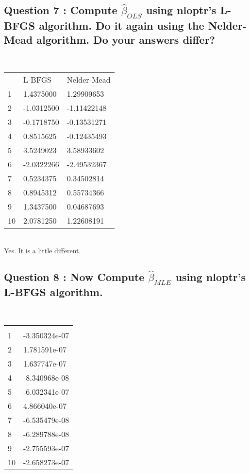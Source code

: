 \documentclass[12pt, letterpaper]{article}
\begin{document}
\subsection*{Question 7 : Compute $\hat{\beta}_{OLS}$ using nloptr's L-BFGS algorithm. Do it again using the Nelder-Mead algorithm. Do your answers differ?}
\\
\begin{table}[h]
\begin{tabular}{lll}
   & L-BFGS & Nelder-Mead    \\
1  & 1.4375000 & 1.29909653 \\
2  & -1.0312500 & -1.11422148 \\
3  & -0.1718750 & -0.13531271 \\
4  & 0.8515625 & -0.12435493 \\
5  & 3.5249023 & 3.58933602 \\
6  & -2.0322266 & -2.49532367 \\
7  & 0.5234375 & 0.34502814 \\
8  & 0.8945312 & 0.55734366 \\
9  & 1.3437500 & 0.04687693 \\
10 & 2.0781250 & 1.22608191
\end{tabular}
\end{table}
\\
Yes. It is a little different. 
\\
\newpage
\subsection*{Question 8 : Now Compute $\hat{\beta}_{MLE}$ using nloptr's L-BFGS algorithm.}
\\
\begin{table}[h]
\begin{tabular}{ll}
   &               \\
1  & -3.350324e-07 \\
2  & 1.781591e-07  \\
3  & 1.637747e-07  \\
4  & -8.340968e-08 \\
5  & -6.032341e-07 \\
6  & 4.866040e-07  \\
7  & -6.535479e-08 \\
8  & -6.289788e-08 \\
9  & -2.755593e-07 \\
10 & -2.658273e-07
\end{tabular}
\end{table}
\\
\end{document}
